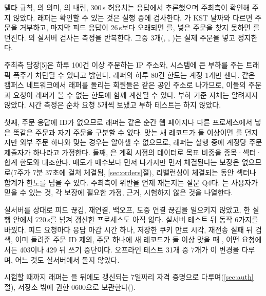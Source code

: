  델타 규칙, 의 의미, 의 내림, 300\,s 허용치는 응답에서 추론했으며 주최측이 확인해 주지 않았다. 래퍼는 확인할 수 있는 것은 실행 중에 검사한다. 가 KST 날짜와 다르면 주문을 거부하고, 마지막 피드 응답이 26\,s보다 오래되면 를, 넣은 주문을 찾지 못하면 를 던진다. 의 실서버 검사는 측정을 반복한다. 그중 3개(, , )는 실제 주문을 넣고 정지한다.

 주최측 답장[5]은 하루 100건 이상 주문하는 IP 주소와, 시스템에 큰 부하를 주는 트래픽 폭주가 차단될 수 있다고 밝힌다. 래퍼의 하루 80건 한도는 계정 1개만 센다. 같은 캠퍼스 네트워크에서 래퍼를 돌리는 회원들은 같은 공인 주소로 나가므로, 이들의 주문과 요청이 래퍼가 볼 수 없는 한도에 함께 계산될 수 있다. 부하 기준 자체는 알려지지 않았다. 시간 측정은 순차 요청 5개씩 보냈고 부하 테스트는 하지 않았다.

 첫째, 주문 응답에 ID가 없으므로 래퍼는 같은 순간 웹 페이지나 다른 프로세스에서 넣은 똑같은 주문과 자기 주문을 구분할 수 없다. 맞는 새 레코드가 둘 이상이면 를 던지지만 외부 주문 하나와 맞는 경우는 알아챌 수 없으므로, 래퍼는 실행 중에 계정당 주문 제출자가 하나라고 가정한다. 둘째, 은 계획 시점의 데이터로 목표 비중을 종목·섹터·합계 한도와 대조한다. 매도가 매수보다 먼저 나가지만 먼저 체결된다는 보장은 없으므로(7주가 7분 37초에 걸쳐 체결됨, \ref{sec:orders}절), 리밸런싱이 체결되는 동안 섹터나 합계가 한도를 넘을 수 있다. 주최측이 위반을 언제 재는지는 질문 Q4다. 는 사용자가 믿을 수 있는 것, 각 보장에 필요한 가정, 근거, 시험하지 않은 것을 나열한다.

 실서버를 상대로 피드 끊김, 재연결, 백오프,  도중 연결 끊김을 일으키지 않았고, 한 실행 안에서 720\,s를 넘겨 갱신한 프로세스도 아직 없다. 실서버 테스트 뒤 동작 6가지를 바꿨다. 피드 요청마다 응답 마감 시간 하나, 저장한 쿠키 만료 시각, 재전송 실패 뒤 검색, 이미 돌려준 주문 ID 제외, 주문 하나에 새 레코드가 둘 이상 맞을 때 , 어떤 요청에서든 403이나 429 뒤 쓰기 중단이다. 오프라인 테스트 31개 중 7개가 이 변경을 다루며, 어느 것도 실서버에서 돌지 않았다.

 시험할 때까지 래퍼는 을  뒤에도 갱신되는 7일짜리 자격 증명으로 다루며(\ref{sec:auth}절), 저장소 밖에 권한 0600으로 보관한다().

